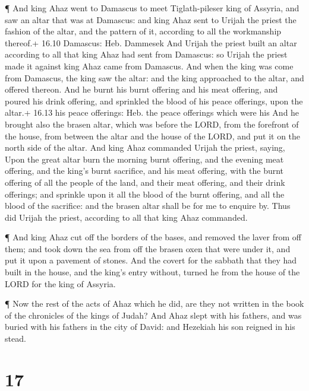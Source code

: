  ¶ And king Ahaz went to Damascus to meet Tiglath-pileser
king of Assyria, and saw an altar that was at Damascus: and king Ahaz
sent to Urijah the priest the fashion of the altar, and the pattern of
it, according to all the workmanship thereof.+ 16.10 Damascus: Heb.
Dammesek  And Urijah the priest built an altar according to
all that king Ahaz had sent from Damascus: so Urijah the priest made it
against king Ahaz came from Damascus.  And when the king
was come from Damascus, the king saw the altar: and the king approached
to the altar, and offered thereon.  And he burnt his burnt
offering and his meat offering, and poured his drink offering, and
sprinkled the blood of his peace offerings, upon the altar.+ 16.13 his
peace offerings: Heb. the peace offerings which were his 
And he brought also the brasen altar, which was before the LORD, from
the forefront of the house, from between the altar and the house of the
LORD, and put it on the north side of the altar.  And king
Ahaz commanded Urijah the priest, saying, Upon the great altar burn the
morning burnt offering, and the evening meat offering, and the king's
burnt sacrifice, and his meat offering, with the burnt offering of all
the people of the land, and their meat offering, and their drink
offerings; and sprinkle upon it all the blood of the burnt offering, and
all the blood of the sacrifice: and the brasen altar shall be for me to
enquire by.  Thus did Urijah the priest, according to all
that king Ahaz commanded.

 ¶ And king Ahaz cut off the borders of the bases, and
removed the laver from off them; and took down the sea from off the
brasen oxen that were under it, and put it upon a pavement of stones.
 And the covert for the sabbath that they had built in the
house, and the king's entry without, turned he from the house of the
LORD for the king of Assyria.

 ¶ Now the rest of the acts of Ahaz which he did, are they
not written in the book of the chronicles of the kings of Judah?
 And Ahaz slept with his fathers, and was buried with his
fathers in the city of David: and Hezekiah his son reigned in his stead.

\hypertarget{section-16}{%
\section{17}\label{section-16}}

